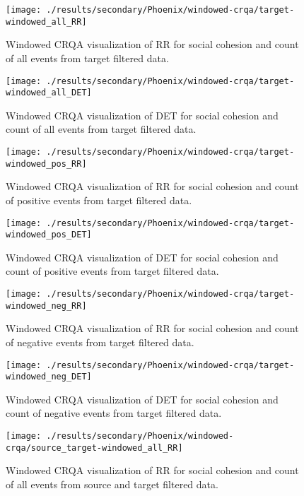 \documentclass[english,man]{apa6}
\begin{document}
\begin{appendix}
\begin{figure}[H]
\texttt{[image: ./results/secondary/Phoenix/windowed-crqa/target-windowed\_all\_RR]} \caption{Windowed CRQA visualization of RR for social cohesion and count of all events from target filtered data.}\label{fig:plot-RR-targ-all-secondary-Phoenix}
\end{figure}
\begin{figure}[H]
\texttt{[image: ./results/secondary/Phoenix/windowed-crqa/target-windowed\_all\_DET]} \caption{Windowed CRQA visualization of DET for social cohesion and count of all events from target filtered data.}\label{fig:plot-DET-targ-all-secondary-Phoenix}
\end{figure}
\begin{figure}[H]
\texttt{[image: ./results/secondary/Phoenix/windowed-crqa/target-windowed\_pos\_RR]} \caption{Windowed CRQA visualization of RR for social cohesion and count of positive events from target filtered data.}\label{fig:plot-RR-targ-pos-secondary-Phoenix}
\end{figure}
\begin{figure}[H]
\texttt{[image: ./results/secondary/Phoenix/windowed-crqa/target-windowed\_pos\_DET]} \caption{Windowed CRQA visualization of DET for social cohesion and count of positive events from target filtered data.}\label{fig:plot-DET-targ-pos-secondary-Phoenix}
\end{figure}
\begin{figure}[H]
\texttt{[image: ./results/secondary/Phoenix/windowed-crqa/target-windowed\_neg\_RR]} \caption{Windowed CRQA visualization of RR for social cohesion and count of negative events from target filtered data.}\label{fig:plot-RR-targ-neg-secondary-Phoenix}
\end{figure}
\begin{figure}[H]
\texttt{[image: ./results/secondary/Phoenix/windowed-crqa/target-windowed\_neg\_DET]} \caption{Windowed CRQA visualization of DET for social cohesion and count of negative events from target filtered data.}\label{fig:plot-DET-targ-neg-secondary-Phoenix}
\end{figure}
\begin{figure}[H]
\texttt{[image: ./results/secondary/Phoenix/windowed-crqa/source\_target-windowed\_all\_RR]} \caption{Windowed CRQA visualization of RR for social cohesion and count of all events from source and target filtered data.}\label{fig:plot-RR-source-targ-all-secondary-Phoenix}

\end{figure}
\end{appendix}
\end{document}
